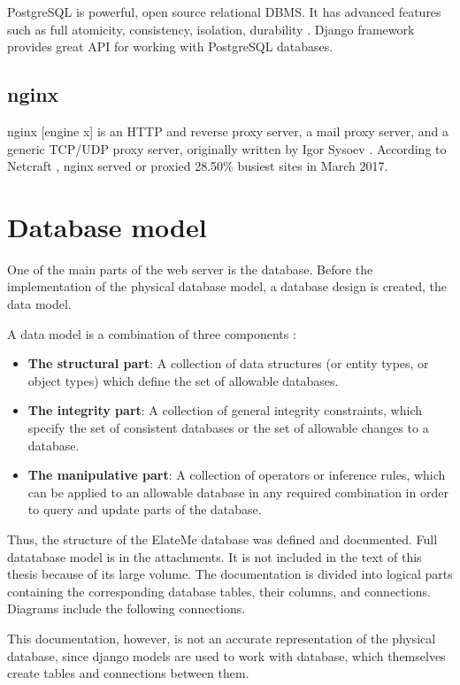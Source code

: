 PostgreSQL is powerful, open source relational \ac{DBMS}. It has advanced features such as full
atomicity, consistency, isolation, durability \cite{postgres}. Django framework provides great \ac{API} for working
with PostgreSQL databases.

\subsection{nginx}
nginx [engine x] is an HTTP and reverse proxy server, a mail proxy server, and a generic TCP/UDP proxy server,
originally written by Igor Sysoev \cite{nginx}. According to Netcraft \cite{netcraft}, nginx served or proxied 28.50\%
busiest sites in March 2017.


\newcommand{\dbpart}[1]{
\item \textbf{#1}}
\section{Database model}
One of the main parts of the web server is the database. Before the implementation of the physical database model, a
database design is created, the data model.

A data model is a combination of three components \cite{dbmodel}:

\begin{itemize}
\dbpart{The structural part}: A collection of data structures (or entity types, or object types) which define the set of
allowable databases.
\dbpart{The integrity part}: A collection of general integrity constraints, which specify the set of consistent databases or the
set of allowable changes to a database.
\dbpart{The manipulative part}: A collection of operators or inference rules, which can be applied to an allowable database in
any required combination in order to query and update parts of the database.
\end{itemize}

Thus, the structure of the ElateMe database was defined and documented. Full datatabase model is in the attachments.
It is not included in the text of this thesis because of its large volume. The documentation is divided into logical
parts containing the corresponding database tables, their columns, and connections. Diagrams include the following
connections.


This documentation, however, is not an accurate representation of the physical database, since django models are used to
work with database, which themselves create tables and connections between them.

